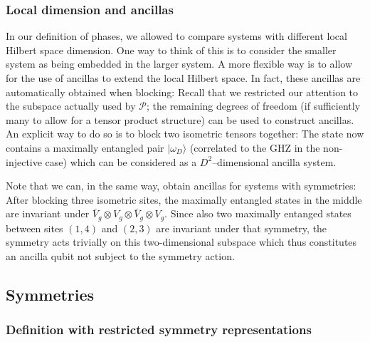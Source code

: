 \documentclass[twocolumn,superscriptaddress,prb,linenumbers]{revtex4-1}
\newcommand{\ket}[1]{\vert#1\rangle}
\newcommand{\mc}[1]{\mathcal{#1}}
\begin{document}
\subsubsection{Local dimension and ancillas
    \label{app:phasedef-ancillas}}

In our definition of phases, we allowed to compare systems with different
local Hilbert space dimension. One way to think of this is to consider the
smaller system as being embedded in the larger system. A more flexible way is to
allow for the use of ancillas to extend the local Hilbert space. In fact,
these ancillas are automatically obtained when blocking: Recall that we
restricted our attention to the subspace actually used by $\mc P$; the
remaining degrees of freedom (if sufficiently many to allow for a
tensor product structure) can be used to construct ancillas. An explicit
way to do so is to block two isometric tensors together: The state now
contains a maximally entangled pair $\ket{\omega_D}$ (correlated to the
GHZ in the non-injective case) which can be considered as a
$D^2$--dimensional ancilla system.

Note that we can, in the same way, obtain ancillas for systems with
symmetries: After blocking three isometric sites, the maximally entangled
states in the middle are invariant under $\bar V_g\otimes V_g\otimes\bar
    V_g\otimes V_g$. Since also two maximally entanged states between sites
$(1,4)$ and $(2,3)$ are invariant under that symmetry, the symmetry acts
trivially on this two-dimensional subspace which thus constitutes an
ancilla qubit not subject to the symmetry action.


\subsection{Symmetries
    \label{sec:discussion-sym}}

\subsubsection{Definition with restricted symmetry representations}
\end{document}
